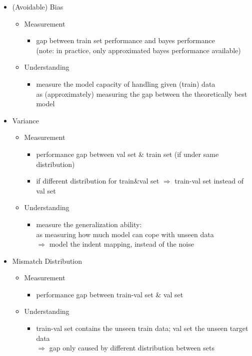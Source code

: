 \begin{itemize}
\item (Avoidable) Bias
	\begin{itemize}
	\item Measurement
		\begin{itemize}
		\item gap between train set performance and bayes performance \\
		(note: in practice, only approximated bayes performance available)
		\end{itemize}
	\item Understanding
		\begin{itemize}
		\item measure the model capacity of handling given (train) data \\
		as (approximately) measuring the gap between the theoretically best model
		\end{itemize}
	\end{itemize}

\item Variance
	\begin{itemize}
	\item Measurement
		\begin{itemize}
		\item performance gap between val set \& train set (if under same distribution)
		\item if different distribution for train\&val set $\Rightarrow$ train-val set instead of val set
		\end{itemize}
	\item Understanding
		\begin{itemize}
		\item measure the generalization ability: \\ 
		as measuring how much model can cope with unseen data \\ 
		$\Rightarrow$ model the indent mapping, instead of the noise
		\end{itemize}
	\end{itemize}

\item Mismatch Distribution
	\begin{itemize}
	\item Measurement
		\begin{itemize}
		\item performance gap between train-val set \& val set
		\end{itemize}
	\item Understanding
		\begin{itemize}
		\item train-val set contains the unseen train data; val set the unseen target data \\
		$\Rightarrow$ gap only caused by different distribution between sets
		\end{itemize}
	\end{itemize}
\end{itemize}

